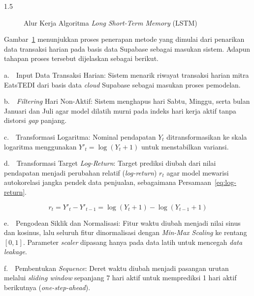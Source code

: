 \documentclass[12pt, a4paper, onecolumn, oneside]{report}
\begin{document}
\begin{spacing}{1.5}
\begin{figure}[H]
{%
    }
    \caption{Alur Kerja Algoritma \textit{Long Short-Term Memory} (LSTM)}
    \label{fig:lstm_alur}
\end{figure}

Gambar~\ref{fig:lstm_alur} menunjukkan proses penerapan metode yang dimulai dari penarikan data transaksi harian pada basis data Supabase sebagai masukan sistem. Adapun tahapan proses tersebut dijelaskan sebagai berikut.

\noindent a.~~Input Data Transaksi Harian: Sistem menarik riwayat transaksi harian mitra EatsTEDI dari basis data \textit{cloud} Supabase sebagai masukan proses pemodelan.

\noindent b.~~\textit{Filtering} Hari Non-Aktif: Sistem menghapus hari Sabtu, Minggu, serta bulan Januari dan Juli agar model dilatih murni pada indeks hari kerja aktif tanpa distorsi \textit{gap} panjang.

\noindent c.~~Transformasi Logaritma: Nominal pendapatan $Y_t$ ditransformasikan ke skala logaritma menggunakan $Y'_t = \log(Y_t + 1)$ untuk menstabilkan variansi.

\noindent d.~~Transformasi Target \textit{Log-Return}: Target prediksi diubah dari nilai pendapatan menjadi perubahan relatif (\textit{log-return}) $r_t$ agar model mewarisi autokorelasi jangka pendek data penjualan, sebagaimana Persamaan~\ref{eq:log-return}.

\begin{equation}
    r_t = Y'_t - Y'_{t-1} = \log(Y_t + 1) - \log(Y_{t-1} + 1)
    \label{eq:log-return}
\end{equation}

\noindent e.~~Pengodean Siklik dan Normalisasi: Fitur waktu diubah menjadi nilai sinus dan kosinus, lalu seluruh fitur dinormalisasi dengan \textit{Min-Max Scaling} ke rentang $[0,1]$. Parameter \textit{scaler} dipasang hanya pada data latih untuk mencegah \textit{data leakage}.

\noindent f.~~Pembentukan \textit{Sequence}: Deret waktu diubah menjadi pasangan urutan melalui \textit{sliding window} sepanjang 7 hari aktif untuk memprediksi 1 hari aktif berikutnya (\textit{one-step-ahead}).


\end{spacing}
\end{document}
